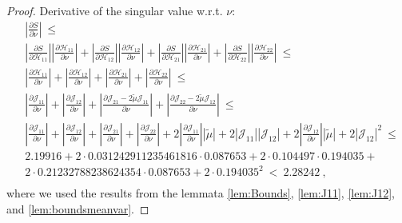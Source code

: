 \documentclass{article}
\newcommand\munn{{\tilde \mu}}
\renewcommand{\leq}{\leqslant}
\begin{document}
\begin{proof}
Derivative of the singular value w.r.t. $\nu$:
\begin{align}
&\left|\frac{\partial S}{\partial \nu}\right| \ \leq \\\nonumber
&\left|\frac{\partial S}{\partial {\mathcal H}_{11}}\right| \left|\frac{\partial {\mathcal H}_{11}}{\partial \nu}\right| + 
\left| \frac{\partial S}{\partial {\mathcal H}_{12}}\right| \left|\frac{\partial {\mathcal H}_{12}}{\partial \nu}\right| + 
\left|\frac{\partial S}{\partial {\mathcal H}_{21}}\right| \left|\frac{\partial {\mathcal H}_{21}}{\partial \nu}\right| + 
\left| \frac{\partial S}{\partial {\mathcal H}_{22}}\right| \left|\frac{\partial {\mathcal H}_{22}}{\partial \nu}\right|
\ \leq \\\nonumber
&\left|\frac{\partial {\mathcal H}_{11}}{\partial \nu}\right| + 
\left|\frac{\partial {\mathcal H}_{12}}{\partial \nu} \right| + 
\left|\frac{\partial {\mathcal H}_{21}}{\partial \nu} \right|+ 
\left|\frac{\partial {\mathcal H}_{22}}{\partial \nu}\right|
\ \leq \\\nonumber
&\left|\frac{\partial {\mathcal J}_{11}}{\partial \nu}\right| + 
\left|\frac{\partial {\mathcal J}_{12}}{\partial \nu} \right| + 
\left|\frac{\partial {\mathcal J}_{21} - 2 \munn {\mathcal J}_{11}}{\partial \nu} \right|+ 
\left|\frac{\partial {\mathcal J}_{22} - 2 \munn {\mathcal J}_{12}}{\partial \nu}\right|
\ \leq \\\nonumber
&\left|\frac{\partial {\mathcal J}_{11}}{\partial \nu}\right| +
\left|\frac{\partial {\mathcal J}_{12}}{\partial \nu} \right| + 
\left|\frac{\partial {\mathcal J}_{21}}{\partial \nu} \right|+ 
\left|\frac{\partial {\mathcal J}_{22}}{\partial \nu}\right| +
2 \left|\frac{\partial {\mathcal J}_{11}}{\partial \nu} \right| \left| \munn\right|  + 2 \left| \mathcal{J}_{11} \right| \left| \mathcal{J}_{12} \right|  +
2 \left|\frac{\partial {\mathcal J}_{12}}{\partial \nu}\right| \left| \munn\right|  + 2  \left| \mathcal{J}_{12} \right|^2 
\ \leq \\\nonumber
& 2.19916 + 2\cdot 0.031242911235461816 \cdot 0.087653 + 2\cdot 0.104497 \cdot 0.194035 + \\\nonumber
& 2 \cdot 0.21232788238624354 \cdot 0.087653 + 2\cdot 0.194035^2 \ < \ 2.28242 \ , \\\nonumber
\end{align}
where we used the results from the lemmata \ref{lem:Bounds}, \ref{lem:J11}, \ref{lem:J12}, and \ref{lem:boundsmeanvar}.



\end{proof}
\end{document}
